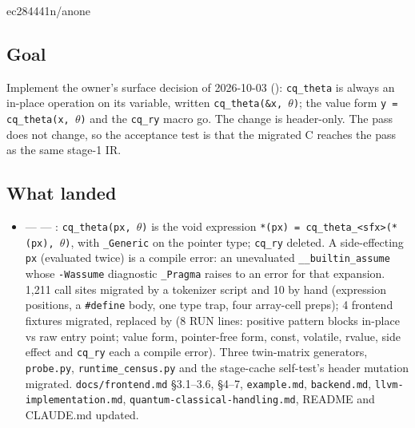 %
  {ec284441}{n/a}{none}

\subsection*{Goal}
Implement the owner's surface decision of 2026-10-03 ():
\texttt{cq\_theta} is always an in-place operation on its variable, written
\texttt{cq\_theta(\&x, $\theta$)}; the value form \texttt{y = cq\_theta(x, $\theta$)} and the
\texttt{cq\_ry} macro go. The change is header-only. The pass does not change, so
the acceptance test is that the migrated C reaches the pass as the same stage-1 IR.

\subsection*{What landed}
\begin{itemize}
  \item {} ---  ---
  : \texttt{cq\_theta(px, $\theta$)} is the void expression
  \texttt{*(px) = cq\_theta\_<sfx>(*(px), $\theta$)}, with \texttt{\_Generic} on the pointer
  type; \texttt{cq\_ry} deleted. A side-effecting \texttt{px} (evaluated twice) is a
  compile error: an unevaluated \texttt{\_\_builtin\_assume} whose \texttt{-Wassume}
  diagnostic \texttt{\_Pragma} raises to an error for that expansion. 1,211 call sites
  migrated by a tokenizer script and 10 by hand (expression positions, a
  \texttt{\#define} body, one type trap, four array-cell preps); 4 frontend fixtures
  migrated,  replaced by
   (8 RUN lines: positive pattern blocks
  in-place vs raw entry point; value form, pointer-free form, const, volatile,
  rvalue, side effect and \texttt{cq\_ry} each a compile error). Three twin-matrix
  generators, \texttt{probe.py}, \texttt{runtime\_census.py} and the stage-cache
  self-test's header mutation migrated. \texttt{docs/frontend.md} \S3.1--3.6, \S4--7,
  \texttt{example.md}, \texttt{backend.md}, \texttt{llvm-implementation.md},
  \texttt{quantum-classical-handling.md}, README and CLAUDE.md updated.
\end{itemize}

